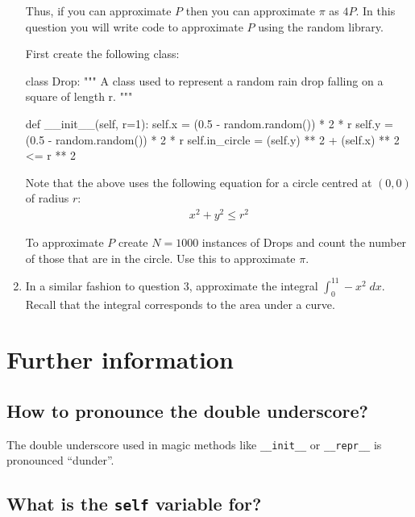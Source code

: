 \begin{enumerate}
Thus, if you can approximate \(P\) then you can approximate \(\pi\) as \(4P\). In this
question you will write code to approximate \(P\) using the random library.


First create the following class:

\begin{pyin}
class Drop:
    """
    A class used to represent a random rain drop falling on a square of
    length r.
    """

    def __init__(self, r=1):
        self.x = (0.5 - random.random()) * 2 * r
        self.y = (0.5 - random.random()) * 2 * r
        self.in_circle = (self.y) ** 2 + (self.x) ** 2 <= r ** 2
\end{pyin}


Note that the above uses the following equation for a circle centred at
\((0,0)\) of radius \(r\):
\begin{equation*}
\begin{split}
       x^2+y^2\leq r^2
   \end{split}
\end{equation*}

To approximate \(P\) create \(N=1000\) instances of Drops and count the
number of those that are in the circle. Use this to approximate \(\pi\).

\item 

In a similar fashion to question 3, approximate the integral
\(\int_{0}^11-x^2\;dx\). Recall that the integral corresponds to the area
under a curve.

\end{enumerate}




\section{Further information}

\subsection{How to pronounce the double underscore?}

The double underscore used in magic methods like \texttt{\_\_init\_\_} or
\texttt{\_\_repr\_\_} is
pronounced ``dunder''.


\subsection{What is the \texttt{self} variable for?}

